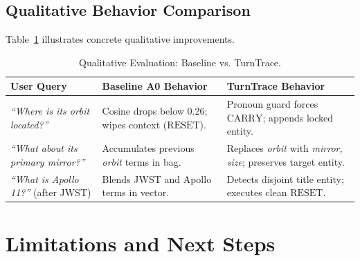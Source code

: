 \documentclass[10pt,a4paper,twocolumn]{article}
\begin{document}
\subsection{Qualitative Behavior Comparison}
Table~\ref{tab:qualitative} illustrates concrete qualitative improvements.

\begin{table}[H]
\centering
\scriptsize
\caption{Qualitative Evaluation: Baseline vs. TurnTrace.}
\label{tab:qualitative}
\begin{tabularx}{\columnwidth}{p{1.8cm} p{2.2cm} p{2.6cm}}
\toprule
\textbf{User Query} & \textbf{Baseline A0 Behavior} & \textbf{TurnTrace Behavior} \\
\midrule
\textit{``Where is its orbit located?''} & Cosine drops below 0.26; wipes context ($\text{RESET}$). & Pronoun guard forces $\text{CARRY}$; appends locked entity. \\
\textit{``What about its primary mirror?''} & Accumulates previous \textit{orbit} terms in bag. & Replaces \textit{orbit} with \textit{mirror, size}; preserves target entity. \\
\textit{``What is Apollo 11?''} (after JWST) & Blends JWST and Apollo terms in vector. & Detects disjoint title entity; executes clean $\text{RESET}$. \\
\bottomrule
\end{tabularx}
\end{table}

\section{Limitations and Next Steps}
\label{sec:limitations}
\end{document}
